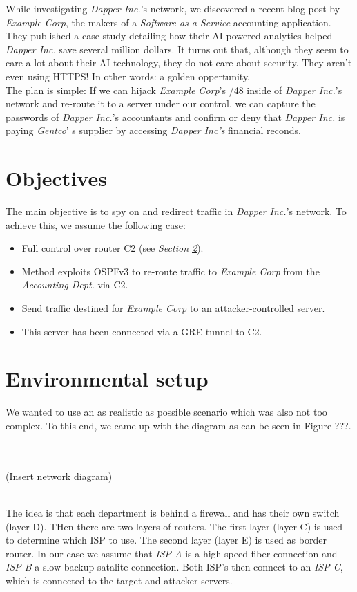 \documentclass[11pt,a4paper,oneside]{article}
\newcommand{\lsection}[2]{\section{#1}\label{sec:#2}}
\begin{document}
    While investigating \textit{Dapper Inc.}'s network, we discovered a recent blog post by \textit{Example Corp}, the makers of a \textit{Software as a Service} accounting application. They published a case study detailing how their AI-powered analytics helped \textit{Dapper Inc.} save several million dollars. It turns out that, although they seem to care a lot about their AI technology, they do not care about security. They aren't even using HTTPS! In other words: a golden oppertunity.\\
    The plan is simple: If we can hijack \textit{Example Corp}'s /48 inside of \textit{Dapper Inc.}'s network and re-route it to a server under our control, we can capture the passwords of \textit{Dapper Inc.}'s accountants and confirm or deny that \textit{Dapper Inc.} is paying \textit{Gentco}' s supplier by accessing \textit{Dapper Inc's} financial reconds.


    \lsection{Objectives}{objectives}
    The main objective is to spy on and redirect traffic in \textit{Dapper Inc.}'s network. To achieve this, we assume the following case:
    \begin{itemize}
        \item Full control over router C2 (see \textit{Section \ref{sec:env_setup}}).
        \item Method exploits OSPFv3 to re-route traffic to \textit{Example Corp} from the \textit{Accounting Dept.} via C2.
        \item Send traffic destined for \textit{Example Corp} to an attacker-controlled server.
        \item This server has been connected via a GRE tunnel to C2.
    \end{itemize}


    \lsection{Environmental setup}{env_setup}
    		We wanted to use an as realistic as possible scenario which was also not too complex. To this end, we came up with the diagram as can be seen in {\color{red} Figure ???}.
    		
    		\strut\\\\(Insert network diagram)\\\\\strut
    		
    		The idea is that each department is behind a firewall and has their own switch (layer D).
    		THen there are two layers of routers. The first layer (layer C) is used to determine which ISP to use. The second layer (layer E) is used as border router.
    		In our case we assume that \textit{ISP A} is a high speed fiber connection and \textit{ISP B} a slow backup satalite connection.
    		Both ISP's then connect to an \textit{ISP C}, which is connected to the target and attacker servers.
    		
\end{document}
